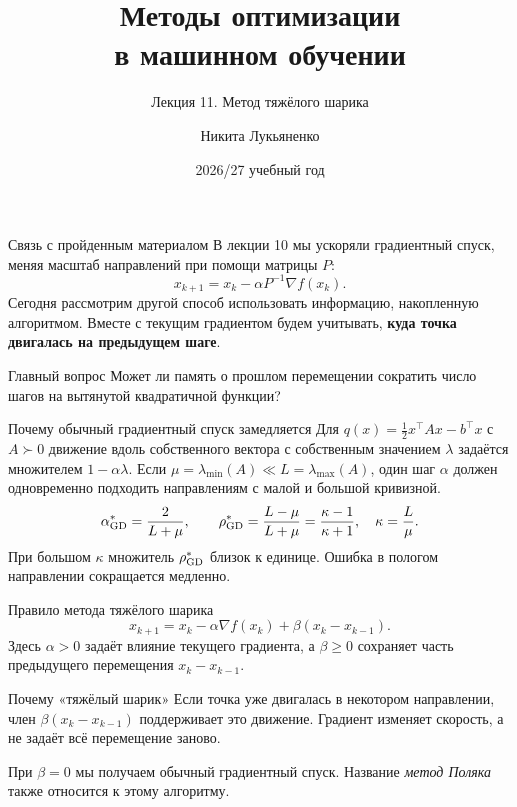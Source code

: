 \documentclass[aspectratio=169,10pt]{beamer}
\title[Методы оптимизации]{Методы оптимизации\\в машинном обучении}
\subtitle{Лекция 11. Метод тяжёлого шарика}
\author[Н. Лукьяненко]{Никита Лукьяненко}
\institute{Совместная программа СМОЛ ГУ и ФКН НИУ ВШЭ}
\date{2026/27 учебный год}
\newcommand{\grad}{\nabla}
\begin{document}
\frame[plain]{\titlepage}

\begin{frame}{Связь с пройденным материалом}
\small
В лекции 10 мы ускоряли градиентный спуск, меняя масштаб направлений при помощи матрицы $P$:
\[
x_{k+1}=x_k-\alpha P^{-1}\grad f(x_k).
\]
Сегодня рассмотрим другой способ использовать информацию, накопленную алгоритмом. Вместе с текущим градиентом будем учитывать, \textbf{куда точка двигалась на предыдущем шаге}.
\begin{block}{Главный вопрос}
Может ли память о прошлом перемещении сократить число шагов на вытянутой квадратичной функции?
\end{block}
\end{frame}

\begin{frame}{Почему обычный градиентный спуск замедляется}
\small
Для $q(x)=\tfrac12x^\top Ax-b^\top x$ с $A\succ0$ движение вдоль собственного вектора с собственным значением $\lambda$ задаётся множителем $1-\alpha\lambda$.
Если $\mu=\lambda_{\min}(A)\ll L=\lambda_{\max}(A)$, один шаг $\alpha$ должен одновременно подходить направлениям с малой и большой кривизной.
\[
\alpha_{\rm GD}^{*}=\frac{2}{L+\mu},\qquad
\rho_{\rm GD}^{*}=\frac{L-\mu}{L+\mu}
=\frac{\kappa-1}{\kappa+1},\quad \kappa=\frac L\mu .
\]
При большом $\kappa$ множитель $\rho_{\rm GD}^{*}$ близок к единице. Ошибка в пологом направлении сокращается медленно.
\end{frame}

\begin{frame}{Правило метода тяжёлого шарика}
\small
\[
\boxed{x_{k+1}=x_k-\alpha\grad f(x_k)+\beta(x_k-x_{k-1}).}
\]
Здесь $\alpha>0$ задаёт влияние текущего градиента, а $\beta\ge0$ сохраняет часть предыдущего перемещения $x_k-x_{k-1}$.
\begin{block}{Почему «тяжёлый шарик»}
Если точка уже двигалась в некотором направлении, член $\beta(x_k-x_{k-1})$ поддерживает это движение. Градиент изменяет скорость, а не задаёт всё перемещение заново.
\end{block}
При $\beta=0$ мы получаем обычный градиентный спуск. Название \emph{метод Поляка} также относится к этому алгоритму.
\end{frame}
\end{document}
